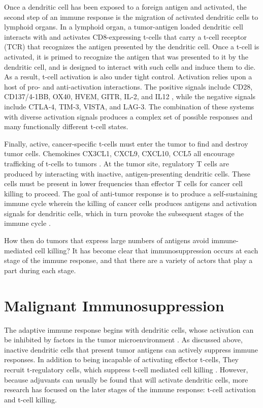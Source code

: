 Once a dendritic cell has been exposed to a foreign antigen and activated, the second step of an immune response is the migration of activated dendritic cells to lymphoid organs. 
In a lymphoid organ, a tumor-antigen loaded dendritic cell interacts with and activates CD8-expressing t-cells that carry a t-cell receptor (TCR) that recognizes the antigen presented by the dendritic cell. 
Once a t-cell is activated, it is primed to recognize the antigen that was presented to it by the dendritic cell, and is designed to interact with such cells and induce them to die. 
As a result, t-cell activation is also under tight control. 
Activation relies upon a host of pro- and anti-activation interactions. 
The positive signals include CD28, CD137/4-1BB, OX40, HVEM, GITR, IL-2, and IL12 \citep{Franciszkiewicz2012,Lippitz2013}, while the negative signals include CTLA-4, TIM-3, VISTA, and LAG-3. %
The combination of these systems with diverse activation signals produces a complex set of possible responses and many functionally different t-cell states.

Finally, active, cancer-specific t-cells must enter the tumor to find and destroy tumor cells. 
Chemokines CX3CL1, CXCL9, CXCL10, CCL5 all encourage trafficking of t-cells to tumors \citep{Franciszkiewicz2012}.
At the tumor site, regulatory T cells are produced by interacting with inactive, antigen-presenting dendritic cells. 
These cells must be present in lower frequencies than effector T cells for cancer cell killing to proceed. 
The goal of anti-tumor response is to produce a self-sustaining immune cycle wherein the killing of cancer cells produces antigens and activation signals for dendritic cells, which in turn provoke the subsequent stages of the immune cycle \citep{Chen2013}.

How then do tumors that express large numbers of antigens avoid immune-mediated cell killing? 
It has become clear that immunosuppression occurs at each stage of the immune response, and that there are a variety of actors that play a part during each stage. 

\section{Malignant Immunosuppression}

The adaptive immune response begins with dendritic cells, whose activation can be inhibited by factors in the tumor microenvironment \citep{Michielsen2012,Chevalier2017}. 
As discussed above, inactive dendritic cells that present tumor antigens can actively suppress immune responses. 
In addition to being incapable of activating effector t-cells, They recruit t-regulatory cells, which suppress t-cell mediated cell killing \citep{Ohta2006,Curiel2004}. 
However, because adjuvants can usually be found that will activate dendritic cells, more research has focused on the later stages of the immune response: t-cell activation and t-cell killing. 

